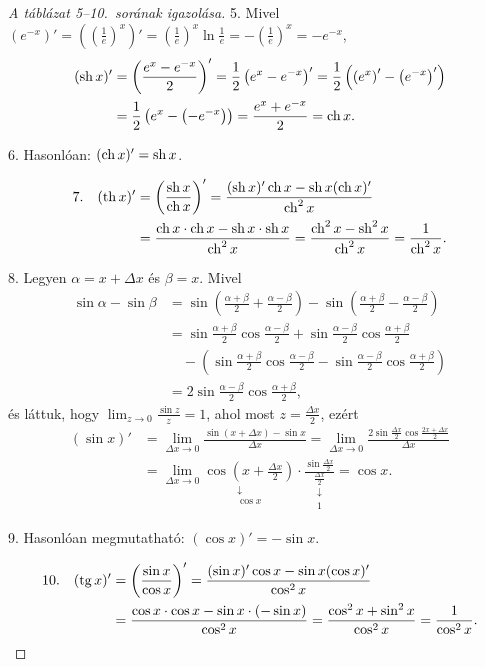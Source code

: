 \documentclass[11pt]{article}
\begin{document}
\begin{proof}[A táblázat 5--10.\ sorának igazolása]
5. Mivel $\left(e^{-x}\right)'=\left(\left(\frac{1}{e}\right)^{x}\right)'=\left(\frac{1}{e}\right)^{x}\ln\frac{1}{e}=-\left(\frac{1}{e}\right)^{x}=-e^{-x}$,
\begin{align*}
(\operatorname{sh} x)'&=\left(\frac{e^{x}-e^{-x}}{2}\right)'=\frac{1}{2}\left(e^{x}-e^{-x}\right)'=\frac{1}{2}\left(\left(e^{x}\right)'-\left(e^{-x}\right)'\right)\\
&=\frac{1}{2}\left(e^{x}-\left(-e^{-x}\right)\right)=\frac{e^{x}+e^{-x}}{2}=\operatorname{ch} x .
\end{align*}

6. Hasonlóan: $(\operatorname{ch} x)'=\operatorname{sh} x$.

\begin{align*}
7.\quad (\operatorname{th} x)'&=\left(\frac{\operatorname{sh} x}{\operatorname{ch} x}\right)'=\frac{(\operatorname{sh} x)'\operatorname{ch} x-\operatorname{sh} x(\operatorname{ch} x)'}{\operatorname{ch}^{2}x}\\
&=\frac{\operatorname{ch} x\cdot\operatorname{ch} x-\operatorname{sh} x\cdot\operatorname{sh} x}{\operatorname{ch}^{2}x}=\frac{\operatorname{ch}^{2}x-\operatorname{sh}^{2}x}{\operatorname{ch}^{2}x}=\frac{1}{\operatorname{ch}^{2}x}.
\end{align*}

8. Legyen $\alpha=x+\Delta x$ és $\beta=x$. Mivel
\begin{align*}
\sin\alpha-\sin\beta&=\sin\left(\frac{\alpha+\beta}{2}+\frac{\alpha-\beta}{2}\right)-\sin\left(\frac{\alpha+\beta}{2}-\frac{\alpha-\beta}{2}\right)\\
&=\sin\frac{\alpha+\beta}{2}\cos\frac{\alpha-\beta}{2}+\sin\frac{\alpha-\beta}{2}\cos\frac{\alpha+\beta}{2}\\
&\quad-\left(\sin\frac{\alpha+\beta}{2}\cos\frac{\alpha-\beta}{2}-\sin\frac{\alpha-\beta}{2}\cos\frac{\alpha+\beta}{2}\right)\\
&=2\sin\frac{\alpha-\beta}{2}\cos\frac{\alpha+\beta}{2},
\end{align*}
és láttuk, hogy $\displaystyle\lim_{z\to 0}\frac{\sin z}{z}=1$, ahol most $z=\frac{\Delta x}{2}$, ezért
\begin{align*}
(\sin x)'&=\lim_{\Delta x\to 0}\frac{\sin(x+\Delta x)-\sin x}{\Delta x}
=\lim_{\Delta x\to 0}\frac{2\sin\frac{\Delta x}{2}\cos\frac{2x+\Delta x}{2}}{\Delta x}\\
&=\lim_{\Delta x\to 0}\underset{\substack{\downarrow\\ \cos x}}{\cos\left(x+\frac{\Delta x}{2}\right)}\cdot
\underset{\substack{\downarrow\\ 1}}{\frac{\sin\frac{\Delta x}{2}}{\frac{\Delta x}{2}}}=\cos x .
\end{align*}

9. Hasonlóan megmutatható: $(\cos x)'=-\sin x$.

\begin{align*}
10.\quad (\operatorname{tg} x)'&=\left(\frac{\sin x}{\cos x}\right)'=\frac{(\sin x)'\cos x-\sin x(\cos x)'}{\cos^{2}x}\\
&=\frac{\cos x\cdot\cos x-\sin x\cdot(-\sin x)}{\cos^{2}x}=\frac{\cos^{2}x+\sin^{2}x}{\cos^{2}x}=\frac{1}{\cos^{2}x}. \qedhere
\end{align*}
\end{proof}
\end{document}
